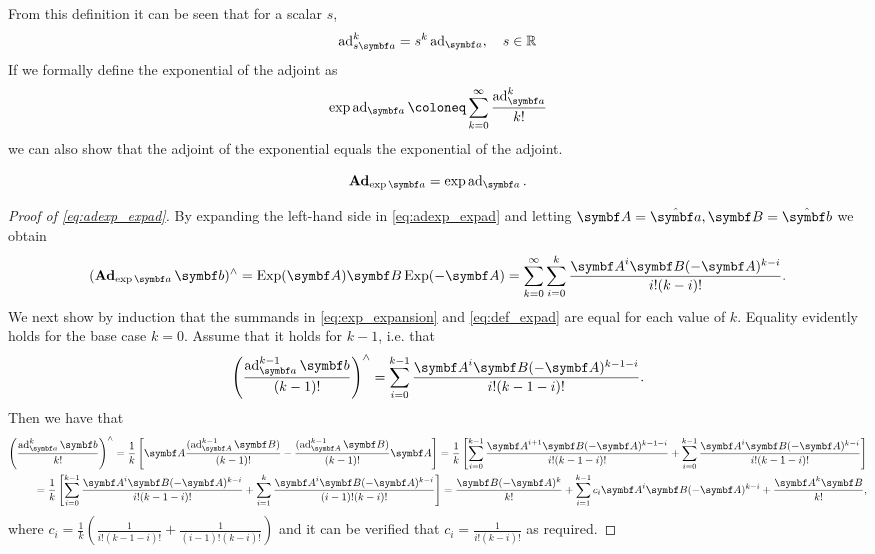 From this definition it can be seen that for a scalar $s$,
\begin{equation}
  \label{eq:ad_scaling}
  \ad_{s \a}^k = s^k \ad_\a, \quad s \in \mathbb{R}
\end{equation}
If we formally define the exponential of the adjoint as
\begin{equation}
  \label{eq:def_expad}
  \exp \ad_\a \coloneq \sum_{k=0}^\infty \frac{\ad^k_\a}{k!}
\end{equation}
we can also show that the adjoint of the exponential equals the exponential of the adjoint.
\begin{properties}
  \begin{equation}
    \label{eq:adexp_expad}
    \bAd_{\exp \a} = \exp \ad_\a.
  \end{equation}
\end{properties}
\begin{proof}[Proof of \eqref{eq:adexp_expad}]
  By expanding the left-hand side in \eqref{eq:adexp_expad} and letting $\A = \hat \a, \B = \hat \b$ we obtain
  \begin{equation}
    \label{eq:exp_expansion}
    (\bAd_{\exp \a} \b)^\wedge = \Exp (\A) \B \Exp (-\A) = \sum_{k=0}^\infty \sum_{i = 0}^{k} \frac{\A^i \B (-\A)^{k-i}}{i! (k - i)!}.
  \end{equation}
  We next show by induction that the summands in \eqref{eq:exp_expansion} and \eqref{eq:def_expad} are equal for each value of $k$. Equality evidently holds for the base case $k=0$. Assume that it holds for $k-1$, i.e. that
  \begin{equation}
    \left( \frac{\ad_{\a}^{k-1} \b}{(k-1)!} \right)^\wedge = \sum_{i=0}^{k-1} \frac{\A^i \B (-\A)^{k-1-i}}{i! (k-1-i)!}.
  \end{equation}
  Then we have that
  \begin{equation*}
    \begin{aligned}
      \left( \frac{\ad_\a^{k} \b}{k!} \right)^\wedge = \frac{1}{k} \left[ \A \frac{(\ad_\A^{k-1} \B)}{(k-1)!} - \frac{(\ad_\A^{k-1} \B)}{(k-1)!} \A \right] =
      \frac{1}{k} \left[ \sum_{i=0}^{k-1} \frac{\A^{i+1} \B (-\A)^{k-1-i}}{i! (k-1-i)!} + \sum_{i=0}^{k-1} \frac{\A^i \B (-\A)^{k-i}}{i! (k-1-i)!} \right] \\
      = \frac{1}{k} \left[ \sum_{i=0}^{k-1} \frac{\A^i \B (-\A)^{k-i}}{i! (k-1-i)!} +  \sum_{i=1}^{k} \frac{\A^{i} \B (-\A)^{k-i}}{(i-1)! (k-i)!} \right] = \frac{\B (-\A)^k}{k!} + \sum_{i=1}^{k-1} c_i \A^i \B (-\A)^{k-i} + \frac{\A^k \B}{k!},
    \end{aligned}
  \end{equation*}
  where $c_i = \frac{1}{k} \left( \frac{1}{i!(k-1-i)!} + \frac{1}{(i-1)!(k-i)!} \right)$ and it can be verified that $c_i = \frac{1}{i!(k-i)!}$ as required.
\end{proof}

